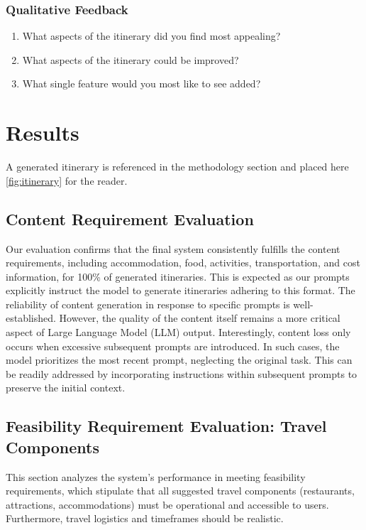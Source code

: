 \documentclass[12pt,a4paper]{report}
\begin{document}
\subsection{Qualitative Feedback}
\begin{enumerate}
\item{What aspects of the itinerary did you find most appealing?}
\item{What aspects of the itinerary could be improved?}
\item{What single feature would you most like to see added?}
\end{enumerate}

\chapter{Results}

A generated itinerary is referenced in the methodology section and placed here \ref{fig:itinerary} for the reader.

\section{Content Requirement Evaluation}

Our evaluation confirms that the final system consistently fulfills the content requirements, including accommodation, food, activities, transportation, and cost information, for 100\% of generated itineraries. This is expected as our prompts explicitly instruct the model to generate itineraries adhering to this format. The reliability of content generation in response to specific prompts is well-established. However, the quality of the content itself remains a more critical aspect of Large Language Model (LLM) output. Interestingly, content loss only occurs when excessive subsequent prompts are introduced. In such cases, the model prioritizes the most recent prompt, neglecting the original task. This can be readily addressed by incorporating instructions within subsequent prompts to preserve the initial context.

\section{Feasibility Requirement Evaluation: Travel Components}

This section analyzes the system's performance in meeting feasibility requirements, which stipulate that all suggested travel components (restaurants, attractions, accommodations) must be operational and accessible to users. Furthermore, travel logistics and timeframes should be realistic.
\end{document}
